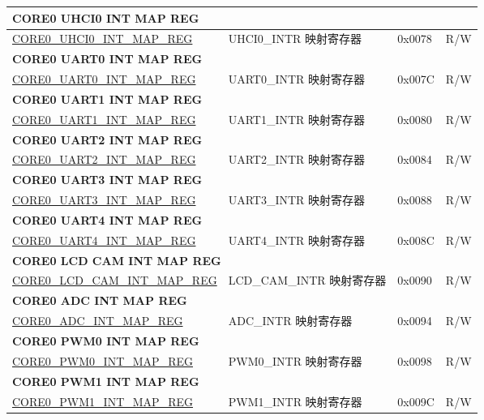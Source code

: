 \begin{longtable}{ | p{8.7cm} | p{6.2cm} | p{1.3cm} | p{1cm} | }
\multicolumn{4}{|l|}{\textbf{CORE0 UHCI0 INT MAP REG}} \\ \hline
\hyperref[regdesc:CORE0UHCI0INTMAPREG]{CORE0\_UHCI0\_INT\_MAP\_REG} & UHCI0\_INTR 映射寄存器 & 0x0078 & R/W \\ \hline
\multicolumn{4}{|l|}{\textbf{CORE0 UART0 INT MAP REG}} \\ \hline
\hyperref[regdesc:CORE0UART0INTMAPREG]{CORE0\_UART0\_INT\_MAP\_REG} & UART0\_INTR 映射寄存器 & 0x007C & R/W \\ \hline
\multicolumn{4}{|l|}{\textbf{CORE0 UART1 INT MAP REG}} \\ \hline
\hyperref[regdesc:CORE0UART1INTMAPREG]{CORE0\_UART1\_INT\_MAP\_REG} & UART1\_INTR 映射寄存器 & 0x0080 & R/W \\ \hline
\multicolumn{4}{|l|}{\textbf{CORE0 UART2 INT MAP REG}} \\ \hline
\hyperref[regdesc:CORE0UART2INTMAPREG]{CORE0\_UART2\_INT\_MAP\_REG} & UART2\_INTR 映射寄存器 & 0x0084 & R/W \\ \hline
\multicolumn{4}{|l|}{\textbf{CORE0 UART3 INT MAP REG}} \\ \hline
\hyperref[regdesc:CORE0UART3INTMAPREG]{CORE0\_UART3\_INT\_MAP\_REG} & UART3\_INTR 映射寄存器 & 0x0088 & R/W \\ \hline
\multicolumn{4}{|l|}{\textbf{CORE0 UART4 INT MAP REG}} \\ \hline
\hyperref[regdesc:CORE0UART4INTMAPREG]{CORE0\_UART4\_INT\_MAP\_REG} & UART4\_INTR 映射寄存器 & 0x008C & R/W \\ \hline
\multicolumn{4}{|l|}{\textbf{CORE0 LCD CAM INT MAP REG}} \\ \hline
\hyperref[regdesc:CORE0LCDCAMINTMAPREG]{CORE0\_LCD\_CAM\_INT\_MAP\_REG} & LCD\_CAM\_INTR 映射寄存器 & 0x0090 & R/W \\ \hline
\multicolumn{4}{|l|}{\textbf{CORE0 ADC INT MAP REG}} \\ \hline
\hyperref[regdesc:CORE0ADCINTMAPREG]{CORE0\_ADC\_INT\_MAP\_REG} & ADC\_INTR 映射寄存器 & 0x0094 & R/W \\ \hline
\multicolumn{4}{|l|}{\textbf{CORE0 PWM0 INT MAP REG}} \\ \hline
\hyperref[regdesc:CORE0PWM0INTMAPREG]{CORE0\_PWM0\_INT\_MAP\_REG} & PWM0\_INTR 映射寄存器 & 0x0098 & R/W \\ \hline
\multicolumn{4}{|l|}{\textbf{CORE0 PWM1 INT MAP REG}} \\ \hline
\hyperref[regdesc:CORE0PWM1INTMAPREG]{CORE0\_PWM1\_INT\_MAP\_REG} & PWM1\_INTR 映射寄存器 & 0x009C & R/W \\ \hline

\end{longtable}
